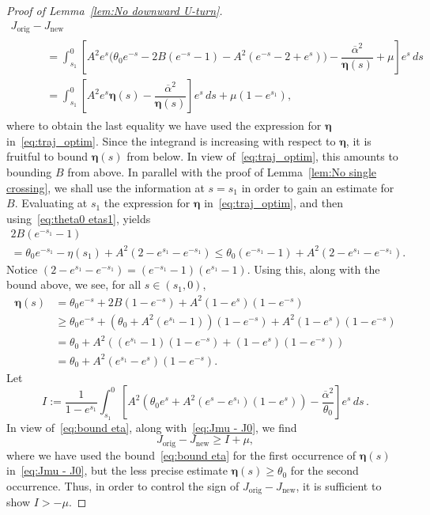 \documentclass[10pt]{amsart}
\theoremstyle{definition}\newtheorem{defi}[theo]{Definition}\newtheorem{rema}[theo]{Remark}\newtheorem{exam}[theo]{Example}\newtheorem{exem}[theo]{Example}\newtheorem{nota}[theo]{Notation}
\newcommand{\orig}{\mathrm{orig}}
\newcommand{\new}{\mathrm{new}}
\newcommand{\beeta}{\boldsymbol{\eta}}
\newcommand{\1}{\mathds{1}}
\begin{document}
\begin{proof}[Proof of Lemma~\ref{lem:No downward U-turn}]
\begin{multline}\label{eq:Jmu - J0}
J_{\orig} - J_{\new} \\
\begin{aligned}
&\qquad = \int_{s_1}^0 \left[A^2 e^s \bigg(\theta_0 e^{-s} - 2 B \left (e^{-s} - 1 \right) - A^2 \left (e^{-s} - 2 + e^s\right)\bigg) - \dfrac{\overline\alpha^2}{\beeta(s)} + \mu\right] e^s\, ds\\
&\qquad = \int_{s_1}^0 \left[A^2 e^s \beeta(s) - \dfrac{\overline\alpha^2}{\beeta(s)} \right] e^s\, ds + \mu\left(1 - e^{s_1}\right),
\end{aligned}
\end{multline}
where to obtain the last equality we have used the expression for $\beeta$ in~\eqref{eq:traj_optim}. Since the integrand is increasing with respect to $\beeta$, it is fruitful to bound $\beeta(s)$ from below. In view of~\eqref{eq:traj_optim}, this amounts to bounding $B$ from above. In parallel with the proof of Lemma~\ref{lem:No single crossing}, we shall use the information at $s = s_1$ in order to gain an estimate for $B$. Evaluating at $s_1$ the expression for $\beeta$ in~\eqref{eq:traj_optim}, and then using~\eqref{eq:theta0 etas1}, yields
\begin{multline*}
2B\left (e^{-s_1} - 1\right) \\
= \theta_0 e^{-s_1} - \eta(s_1) + A ^2 \left(2 - e^{s_1} - e^{-s_1}\right)
\leq \theta_0 \left(e^{-s_1} - 1\right) + A ^2 \left(2 - e^{s_1} - e^{-s_1}\right).
\end{multline*}
Notice $(2- e^{s_1}-e^{-s_1}) = (e^{-s_1}-1)(e^{s_1}-1)$. Using this, along with the bound above, we see, for all $s \in (s_1,0)$,
\begin{equation}\label{eq:bound eta}
\begin{split}
\beeta(s) &= \theta_0 e^{-s} + 2 B\left(1-e^{-s}\right) + A^2 \left(1- e^s\right)\left(1-e^{-s}\right)\\
& \geq \theta_0 e^{-s} + \left(\theta_0 + A ^2\left(e^{s_1} - 1\right)\right) \left(1 - e^{-s}\right) + A ^2 \left(1- e^s\right)\left(1-e^{-s}\right)\\
& = \theta_0 + A^2\left(\left(e^{s_1}-1\right) \left(1- e^{-s} \right) + \left(1- e^s\right)\left(1-e^{-s}\right)\right)\\
& = \theta_0 + A^2 \left(e^{s_1} - e^s \right) \left(1 - e^{-s} \right).
\end{split}
\end{equation}
Let
\[
I := \dfrac{1}{1 - e^{s_1}} \int_{s_1}^0 \left[A^2 \left(\theta_0 e^s + A^2 \left(e^{s} - e^{s_1} \right) \left(1 - e^{s} \right) \right) - \dfrac{\overline\alpha^2}{\theta_0 } \right] e^s\, ds\,.
\]
In view of~\eqref{eq:bound eta}, along with~\eqref{eq:Jmu - J0}, we find
\[
J_{\orig} - J_{\new} \geq I + \mu,
\]
where we have used the bound~\eqref{eq:bound eta} for the first occurrence of $\beeta(s)$ in~\eqref{eq:Jmu - J0}, but the less precise estimate $\beeta(s)\geq \theta_0$ for the second occurrence. Thus, in order to control the sign of $J_{\orig} - J_{\new}$, it is sufficient to show $I > -\mu$.




\end{proof}
\end{document}
